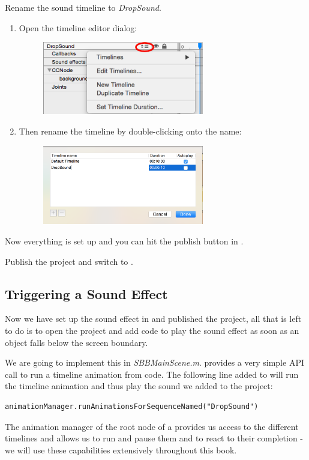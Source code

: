 \begin{leftbar}
Rename the sound timeline to  \textit{DropSound}\label{timeline_rename}.
\begin{enumerate}
  \item Open the timeline editor dialog:
  \begin{figure}[H]
    \centering
    \includegraphics[width=200pt]{images/Chapter2/edit_timeline.png}
  \end{figure}
  \item Then rename the timeline by double-clicking onto the name:
  \begin{figure}[H]
    \centering
    \includegraphics[width=200pt]{images/Chapter2/rename_timeline.png}
  \end{figure}
\end{enumerate}

\end{leftbar}

Now everything is set up and you can hit the publish button in \SB{}.

\begin{leftbar}
Publish the \SB{} project and switch to \xcode{}.
\end{leftbar}

\subsection{Triggering a Sound Effect}
Now we have set up the sound effect in \SB{} and published the project, all that
is left to do is to open the \xcode{} project and add code to play the sound
effect as soon as an object falls below the screen boundary.

We are going to implement this in \textit{SBBMainScene.m}. \cocos{} provides a
very simple API call to run a timeline animation from code. The following line
added to  will run the timeline animation and thus play the
sound we added to the project:
\begin{lstlisting}
animationManager.runAnimationsForSequenceNamed("DropSound")
\end{lstlisting}
The animation manager of the root node of a \ccbfile{} provides us access to the
different timelines and allows us to run and pause them and to react to their
completion - we will use these capabilities extensively throughout this book.

